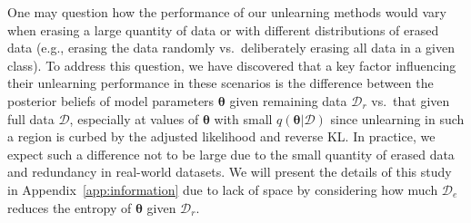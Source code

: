 \documentclass{article}
\theoremstyle{definition}
\newcommand{\mcl}[1]{\mathcal{#1}}
\newcommand{\da}{\mcl{D}}
\newcommand{\dc}{\mcl{D}_r}
\newcommand{\dr}{\mcl{D}_e}
\begin{document}
One may question how the performance of our unlearning methods would vary when erasing a large quantity of data or with different distributions of erased data (e.g., erasing the data randomly vs.~deliberately erasing all data in a given class). 
To address this question, 
we have discovered that a key factor influencing their unlearning performance in these scenarios is the difference between the posterior beliefs of model parameters $\bm{\theta}$ given remaining data $\dc$ vs.~that given full data $\da$, especially at values of $\bm{\theta}$ with small $q(\bm{\theta}|\da)$ since unlearning in such a region is curbed by the adjusted likelihood and reverse KL.
%
In practice, we expect such a difference not to be large due to the small quantity of erased data and redundancy in real-world datasets.
%
%
We will present the details of this study in Appendix~\ref{app:information} due to lack of space by considering how much $\dr$ reduces the entropy of $\bm{\theta}$ given $\dc$.
%
\end{document}
